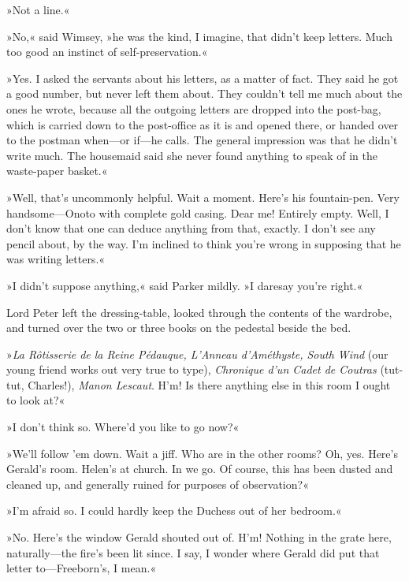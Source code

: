 »Not a line.«

»No,« said Wimsey, »he was the kind, I imagine, that didn't keep letters. Much too good an instinct of self-preservation.«

»Yes. I asked the servants about his letters, as a matter of fact. They said he got a good number, but never left them about. They couldn't tell me much about the ones he wrote, because all the outgoing letters are dropped into the post-bag, which is carried down to the post-office as it is and opened there, or handed over to the postman when\allowbreak---\allowbreak or if\allowbreak---\allowbreak he calls. The general impression was that he didn't write much. The housemaid said she never found anything to speak of in the waste-paper basket.«

»Well, that's uncommonly helpful. Wait a moment. Here's his fountain-pen. Very handsome\allowbreak---\allowbreak Onoto with complete gold casing. Dear me! Entirely empty. Well, I don't know that one can deduce anything from that, exactly. I don't see any pencil about, by the way. I'm inclined to think you're wrong in supposing that he was writing letters.«

»I didn't suppose anything,« said Parker mildly. »I daresay you're right.«

Lord Peter left the dressing-table, looked through the contents of the wardrobe, and turned over the two or three books on the pedestal beside the bed.

»\foreignlanguage{french}{\textit{La Rôtisserie de la Reine Pédauque, L'Anneau d'Améthyste, South Wind}} (our young friend works out very true to type), \foreignlanguage{french}{\textit{Chronique d'un Cadet de Coutras}} (tut-tut, Charles!), \textit{Manon Lescaut}. H'm! Is there anything else in this room I ought to look at?«

»I don't think so. Where'd you like to go now?«

»We'll follow 'em down. Wait a jiff. Who are in the other rooms? Oh, yes. Here's Gerald's room. Helen's at church. In we go. Of course, this has been dusted and cleaned up, and generally ruined for purposes of observation?«

»I'm afraid so. I could hardly keep the Duchess out of her bedroom.«

»No. Here's the window Gerald shouted out of. H'm! Nothing in the grate here, naturally\allowbreak---\allowbreak the fire's been lit since. I say, I wonder where Gerald did put that letter to\allowbreak---\allowbreak Freeborn's, I mean.«

